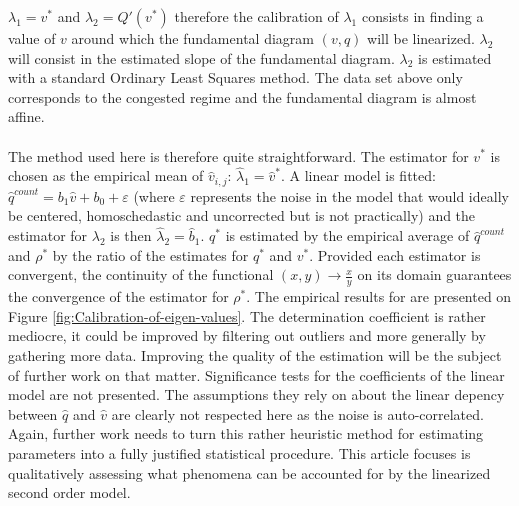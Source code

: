 \documentclass[preprint]{elsarticle}
\begin{document}
$\lambda_{1}=v^{*}$ and $\lambda_{2}=Q'\left(v^{*}\right)$ therefore
the calibration of $\lambda_{1}$ consists in finding a value of $v$
around which the fundamental diagram $\left(v,q\right)$ will be linearized.
$\lambda_{2}$ will consist in the estimated slope of the fundamental
diagram. $\lambda_{2}$ is estimated with a standard Ordinary Least
Squares method. The data set above only corresponds to the congested
regime and the fundamental diagram is almost affine.\\
\\
The method used here is therefore quite straightforward. The estimator
for $v^{*}$ is chosen as the empirical mean of $\widehat{v}_{i,j}$:
$\widehat{\lambda}_{1}=\widehat{v}^{*}$. A linear model is fitted:
$\widehat{q}^{count}=b_{1}\widehat{v}+b_{0}+\varepsilon$ (where $\varepsilon$
represents the noise in the model that would ideally be centered,
homoschedastic and uncorrected but is not practically) and the estimator
for $\lambda_{2}$ is then $\widehat{\lambda}_{2}=\widehat{b}_{1}$.
$q^{*}$ is estimated by the empirical average of $\widehat{q}^{count}$
and $\rho^{*}$ by the ratio of the estimates for $q^{*}$ and $v^{*}$.
Provided each estimator is convergent, the continuity of the functional
$\left(x,y\right)\rightarrow\frac{x}{y}$ on its domain guarantees
the convergence of the estimator for $\rho^{*}$. The empirical results
for are presented on Figure \ref{fig:Calibration-of-eigen-values}.
The determination coefficient is rather mediocre, it could be improved
by filtering out outliers and more generally by gathering more data.
Improving the quality of the estimation will be the subject of further
work on that matter. Significance tests for the coefficients of the
linear model are not presented. The assumptions they rely on about
the linear depency between $\widehat{q}$ and $\widehat{v}$ are clearly
not respected here as the noise is auto-correlated. Again, further
work needs to turn this rather heuristic method for estimating parameters
into a fully justified statistical procedure. This article focuses
is qualitatively assessing what phenomena can be accounted for by
the linearized second order model.
\end{document}
